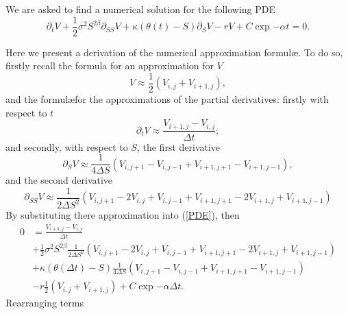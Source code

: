 We are asked to find a numerical solution for the following PDE
\begin{equation}\label{PDE}
	\partial_t V + \frac{1}{2}\sigma^2 S^{2\beta} \partial_{SS}V + \kappa(\theta(t) - S)\partial_S V - rV + C \exp{-\alpha t} = 0.
\end{equation}

Here we present a derivation of the numerical approximation formul\ae. To do so, firstly recall the formula for an approximation for $V$
\begin{equation}
		V \approx \frac{1}{2}\left(V_{i,j} + V_{i+1,j}\right),
\end{equation}
and the formul\ae for the approximations of the partial derivatives: firstly with respect to $t$
\begin{equation}\label{partial_wrt_t}
	\partial_t V \approx \frac{V_{i+1,j} - V_{i,j}}{\Delta t};
\end{equation}
and secondly, with respect to $S$, the first derivative
\begin{equation}\label{first_wrt_S}
	\partial_S V 	\approx \frac{1}{4\Delta S}\left(V_{i,j+1} - V_{i,j-1} + V_{i+1,j+1} - V_{i+1,j-1}\right),
\end{equation}
and the second derivative
\begin{equation}\label{second_wrt_S}
	\partial_{SS} V	\approx \frac{1}{2\Delta S^2}\left(V_{i,j+1} - 2V_{i,j } + V_{i,j-1}+ V_{i+1,j+1}-2V_{i+1,j} + V_{i+1,j-1}\right)
\end{equation}
By substituting there approximation into (\ref{PDE}), then
$$
	\begin{aligned}
		0 	&= \frac{V_{i+1,j} - V_{i,j}}{\Delta t} \\
			&+ \frac{1}{2}\sigma^2 S^{2\beta} \frac{1}{2\Delta S^2}\left(V_{i,j+1} - 2V_{i,j } + V_{i,j-1}+ V_{i+1,j+1}-2V_{i+1,j} + V_{i+1,j-1}\right) \\
			&+ \kappa(\theta(\Delta t) - S)\frac{1}{4\Delta S}\left(V_{i,j+1} - V_{i,j-1} + V_{i+1,j+1} - V_{i+1,j-1}\right) \\
			&- r\frac{1}{2}\left(V_{i,j} + V_{i+1,j}\right) + C \exp{-\alpha \Delta t}.
	\end{aligned}
$$
Rearranging terms

